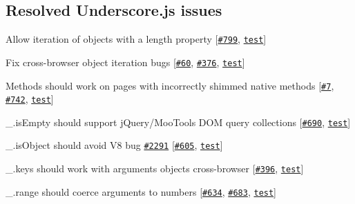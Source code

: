 \subsection*{Resolved Underscore.\+js issues}


\begin{DoxyItemize}
\item Allow iteration of objects with a {\ttfamily length} property \mbox{[}\href{https://github.com/documentcloud/underscore/pull/799}{\tt \#799}, \href{https://github.com/lodash/lodash/blob/0.9.2/test/test.js#L545-551}{\tt test}\mbox{]}
\item Fix cross-\/browser object iteration bugs \mbox{[}\href{https://github.com/documentcloud/underscore/issues/60}{\tt \#60}, \href{https://github.com/documentcloud/underscore/issues/376}{\tt \#376}, \href{https://github.com/lodash/lodash/blob/0.9.2/test/test.js#L558-582}{\tt test}\mbox{]}
\item Methods should work on pages with incorrectly shimmed native methods \mbox{[}\href{https://github.com/documentcloud/underscore/issues/7}{\tt \#7}, \href{https://github.com/documentcloud/underscore/issues/742}{\tt \#742}, \href{https://github.com/lodash/lodash/blob/0.9.2/test/test.js#L140-146}{\tt test}\mbox{]}
\item {\ttfamily \+\_\+.\+is\+Empty} should support j\+Query/\+Moo\+Tools D\+OM query collections \mbox{[}\href{https://github.com/documentcloud/underscore/pull/690}{\tt \#690}, \href{https://github.com/lodash/lodash/blob/0.9.2/test/test.js#L747-752}{\tt test}\mbox{]}
\item {\ttfamily \+\_\+.\+is\+Object} should avoid V8 bug \href{http://code.google.com/p/8/issues/detail?id=2291}{\tt \#2291} \mbox{[}\href{https://github.com/documentcloud/underscore/issues/605}{\tt \#605}, \href{https://github.com/lodash/lodash/blob/0.9.2/test/test.js#L828-840}{\tt test}\mbox{]}
\item {\ttfamily \+\_\+.\+keys} should work with {\ttfamily arguments} objects cross-\/browser \mbox{[}\href{https://github.com/documentcloud/underscore/issues/396}{\tt \#396}, \href{https://github.com/lodash/lodash/blob/0.9.2/test/test.js#L921-923}{\tt test}\mbox{]}
\item {\ttfamily \+\_\+.\+range} should coerce arguments to numbers \mbox{[}\href{https://github.com/documentcloud/underscore/issues/634}{\tt \#634}, \href{https://github.com/documentcloud/underscore/issues/683}{\tt \#683}, \href{https://github.com/lodash/lodash/blob/0.9.2/test/test.js#L1337-1340}{\tt test}\mbox{]}
\end{DoxyItemize}

